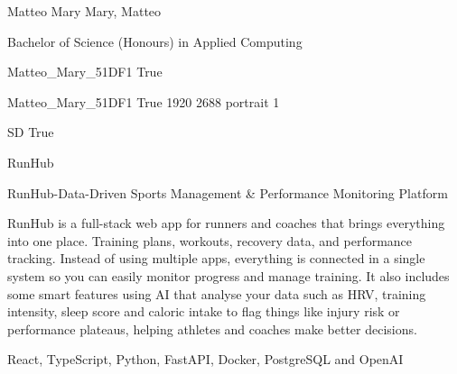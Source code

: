 \documentclass[twoside]{report}
\begin{document}
\begingroup{}\relax



\def\Key{Matteo_Mary_51DF1}

{Matteo Mary}
{Mary, Matteo}

{Bachelor of Science (Honours) in Applied Computing}

{Matteo_Mary_51DF1}
{True}

{Matteo_Mary_51DF1}
{True}
{1920}
{2688}
{portrait}
{1}

{SD}
{True}

{RunHub}

{RunHub-Data-Driven Sports Management \& Performance Monitoring Platform}

{RunHub is a full-stack web app for runners and coaches that brings everything into one place. Training plans, workouts, recovery data, and performance tracking. Instead of using multiple apps, everything is connected in a single system so you can easily monitor progress and manage training. It also includes some smart features using AI that analyse your data such as HRV, training intensity, sleep score and caloric intake to flag things like injury risk or performance plateaus, helping athletes and coaches make better decisions.}

{React, TypeScript, Python, FastAPI, Docker, PostgreSQL and OpenAI}
\end{document}
